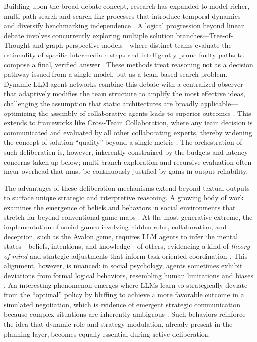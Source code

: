 \documentclass[11pt,a4paper]{article}
\begin{document}
Building upon the broad debate concept, research has expanded to model richer, multi-path search and search-like processes that introduce temporal dynamics and diversify benchmarking independence \cite{arxiv:2309.07864v3,arxiv:2308.10848v3}. A logical progression beyond linear debate involves concurrently exploring multiple solution branches---Tree-of-Thought and graph-perspective models---where distinct teams evaluate the rationality of specific intermediate steps and intelligently prune faulty paths to compose a final, verified answer \cite{arxiv:2310.02170v1}. These methods treat reasoning not as a decision pathway issued from a single model, but as a team-based search problem. Dynamic LLM-agent networks combine this debate with a centralized observer that adaptively modifies the team structure to amplify the most effective ideas, challenging the assumption that static architectures are broadly applicable---optimizing the assembly of collaborative agents leads to superior outcomes \cite{arxiv:2310.02170v1}. This extends to frameworks like Cross-Team Collaboration, where any team decision is communicated and evaluated by all other collaborating experts, thereby widening the concept of solution ``quality'' beyond a single metric \cite{arxiv:2406.08979v1}. The orchestration of such deliberation is, however, inherently constrained by the budgets and latency concerns taken up below; multi-branch exploration and recursive evaluation often incur overhead that must be continuously justified by gains in output reliability.

The advantages of these deliberation mechanisms extend beyond textual outputs to surface unique strategic and interpretive reasoning. A growing body of work examines the emergence of beliefs and behaviors in social environments that stretch far beyond conventional game maps \cite{arxiv:2310.14985v3,arxiv:2402.08189v1}. At the most generative extreme, the implementation of social games involving hidden roles, collaboration, and deception, such as the Avalon game, requires LLM agents to infer the mental states---beliefs, intentions, and knowledge---of others, evidencing a kind of \emph{theory of mind} and strategic adjustments that inform task-oriented coordination \cite{arxiv:2310.10701v2,arxiv:2310.14985v3}. This alignment, however, is nuanced: in social psychology, agents sometimes exhibit deviations from formal logical behaviors, resembling human limitations and biases \cite{arxiv:2402.04559v2,arxiv:2402.08189v1}. An interesting phenomenon emerges where LLMs learn to strategically deviate from the ``optimal'' policy by bluffing to achieve a more favorable outcome in a simulated negotiation, which is evidence of emergent strategic communication because complex situations are inherently ambiguous \cite{arxiv:2310.10701v2,arxiv:2402.08189v1}. Such behaviors reinforce the idea that dynamic role and strategy modulation, already present in the planning layer, becomes equally essential during active deliberation.
\end{document}
